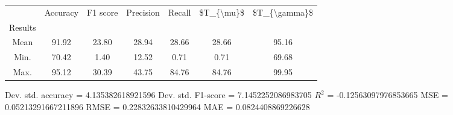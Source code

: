 \begin{tabular}{|c|c|c|c|c|c|c|}
\toprule
{} &  Accuracy &  F1 score &  Precision &  Recall &  \$T\_\{\textbackslash mu\}\$ &  \$T\_\{\textbackslash gamma\}\$ \\
Results &           &           &            &         &            &               \\
\hline
Mean    &     91.92 &     23.80 &      28.94 &   28.66 &      28.66 &         95.16 \\
Min.    &     70.42 &      1.40 &      12.52 &    0.71 &       0.71 &         69.68 \\
Max.    &     95.12 &     30.39 &      43.75 &   84.76 &      84.76 &         99.95 \\
\bottomrule
\end{tabular}

 Dev. std. accuracy = 4.135382618921596
 Dev. std. F1-score = 7.1452252086983705
 $R^2$ = -0.12563097976853665
 MSE = 0.05213291667211896
 RMSE = 0.22832633810429964
 MAE = 0.0824408869226628